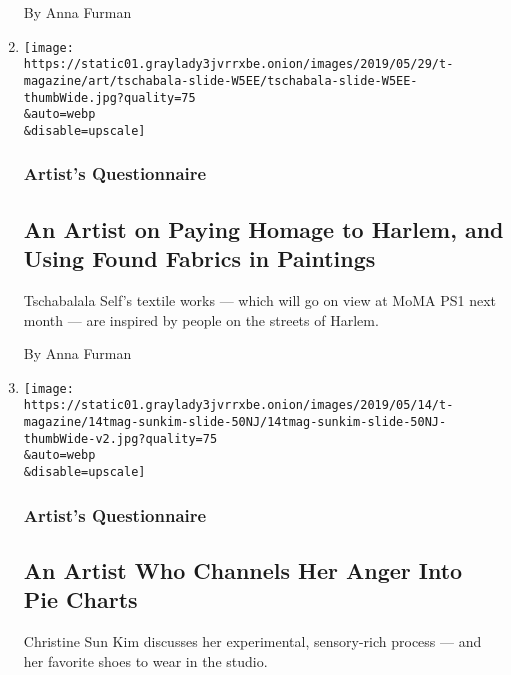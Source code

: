 \begin{enumerate}
  By Anna Furman
\item
  \href{/2019/05/31/t-magazine/tschabalala-self-artist-studio.html}{}

  \texttt{[image: https://static01.graylady3jvrrxbe.onion/images/2019/05/29/t-magazine/art/tschabala-slide-W5EE/tschabala-slide-W5EE-thumbWide.jpg?quality=75\\\&auto=webp\\\&disable=upscale]}

  \hypertarget{artists-questionnaire-1}{%
  \subsubsection{Artist's Questionnaire}\label{artists-questionnaire-1}}

  \hypertarget{an-artist-on-paying-homage-to-harlem-and-using-found-fabrics-in-paintings}{%
  \subsection{An Artist on Paying Homage to Harlem, and Using Found
  Fabrics in
  Paintings}\label{an-artist-on-paying-homage-to-harlem-and-using-found-fabrics-in-paintings}}

  Tschabalala Self's textile works --- which will go on view at MoMA PS1
  next month --- are inspired by people on the streets of Harlem.

  By Anna Furman
\item
  \href{/2019/05/21/t-magazine/christine-sun-kim-artist.html}{}

  \texttt{[image: https://static01.graylady3jvrrxbe.onion/images/2019/05/14/t-magazine/14tmag-sunkim-slide-50NJ/14tmag-sunkim-slide-50NJ-thumbWide-v2.jpg?quality=75\\\&auto=webp\\\&disable=upscale]}

  \hypertarget{artists-questionnaire-2}{%
  \subsubsection{Artist's Questionnaire}\label{artists-questionnaire-2}}

  \hypertarget{an-artist-who-channels-her-anger-into-pie-charts}{%
  \subsection{An Artist Who Channels Her Anger Into Pie
  Charts}\label{an-artist-who-channels-her-anger-into-pie-charts}}

  Christine Sun Kim discusses her experimental, sensory-rich process ---
  and her favorite shoes to wear in the studio.


\end{enumerate}
